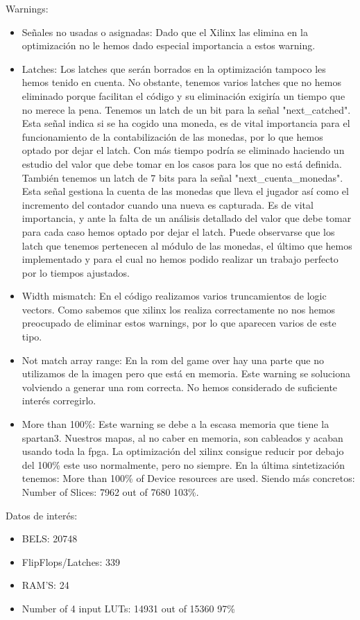 \documentclass[11pt, a4paper, spanish, openright, twoside]{book}
\begin{document}
	Warnings:
	\begin{itemize}
	\item Señales no usadas o asignadas: Dado que el Xilinx las elimina en la optimización no le hemos dado especial importancia a estos warning.
	\item Latches: Los latches que serán borrados en la optimización tampoco les hemos tenido en cuenta. No obstante, tenemos varios latches que no hemos eliminado porque 
	facilitan el código y su eliminación exigiría un tiempo que no merece la pena.	Tenemos un latch de un bit para la señal "next\_catched". Esta señal indica si se ha cogido una moneda,
	es de vital importancia para el funcionamiento de la contabilización de las monedas, por lo que hemos optado por dejar el latch. Con más tiempo podría se eliminado haciendo un 
	estudio del valor que debe tomar en los casos para los que no está definida.	También tenemos un latch de 7 bits para la señal "next\_cuenta\_monedas". Esta señal gestiona
	 la cuenta de las monedas que lleva el jugador así como el incremento del contador cuando una nueva es capturada. Es de vital importancia, y ante la falta de un análisis detallado
	del valor que debe tomar para cada caso  hemos optado por dejar el latch. Puede observarse que los latch que tenemos pertenecen al módulo de las monedas, el último
	 que hemos implementado y para el cual no hemos podido realizar un trabajo perfecto por lo tiempos ajustados.	
	\item Width mismatch: En el código realizamos varios truncamientos de logic vectors. Como sabemos que xilinx los realiza correctamente no nos hemos preocupado de eliminar
	estos warnings, por lo que aparecen varios de este tipo.
	\item Not match array range: En la rom del game over hay una parte que no utilizamos de la imagen pero que está en memoria. Este warning se soluciona volviendo a generar una rom correcta.
	 No hemos considerado de suficiente interés corregirlo.
	\item More than 100\%: Este warning se debe a la escasa memoria que tiene la spartan3. Nuestros mapas, al no caber en memoria, son cableados y acaban usando toda la fpga. La optimización del xilinx 
	consigue reducir por debajo del 100\% este uso normalmente, pero no siempre. En la última sintetización tenemos: More than 100\% of Device resources are used. Siendo más concretos:	
	Number of Slices:  7962  out of   7680   103\%. 
\end{itemize}
	Datos de interés:
	\begin{itemize}
	\item BELS: 20748
	\item FlipFlops/Latches: 339
	\item RAM'S: 24
	\item  Number of 4 input LUTs:  14931  out of  15360    97\%  


\end{itemize}
\end{document}
